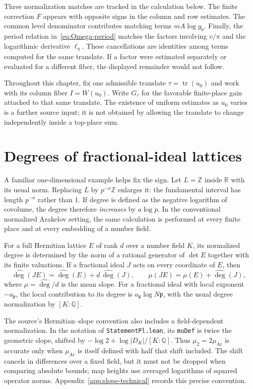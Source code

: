 \documentclass[11pt,openany,oneside]{scrbook}
\theoremstyle{definition}
\theoremstyle{remark}
\newcommand{\RR}{\mathbb R}
\newcommand{\QQ}{\mathbb Q}
\newcommand{\ZZ}{\mathbb Z}
\begin{document}
Three normalization matches are tracked in the calculation below. The finite correction $F$ appears with opposite signs in the column and row estimates. The common level denominator contributes matching terms $mA\log g_0$. Finally, the period relation in~\eqref{eq:Omega-period} matches the factors involving $v/\pi$ and the logarithmic derivative $\ell_\eta$. These cancellations are identities among terms computed for the same translate. If a factor were estimated separately or evaluated for a different fiber, the displayed remainder would not follow.

Throughout this chapter, fix one admissible translate $\tau=\operatorname{tr}(u_0)$ and work with its column fiber $I=W(u_0)$. Write $G_\tau$ for the favorable finite-place gain attached to that same translate. The existence of uniform estimates as $u_0$ varies is a further source input; it is not obtained by allowing the translate to change independently inside a top-place sum.

\section{Degrees of fractional-ideal lattices}\label{sec:balance-degree}

A familiar one-dimensional example helps fix the sign.  Let $L=\ZZ$ inside $\RR$ with its usual norm.  Replacing $L$ by $p^{-a}\ZZ$ enlarges it: the fundamental interval has length $p^{-a}$ rather than $1$.  If degree is defined as the negative logarithm of covolume, the degree therefore \emph{increases} by $a\log p$.  In the conventional normalized Arakelov setting, the same calculation is performed at every finite place and at every embedding of a number field.

For a full Hermitian lattice $E$ of rank $d$ over a number field $K$, its normalized degree is determined by the norm of a rational generator of $\det E$ together with its finite valuations.  If a fractional ideal $J$ acts on every coordinate of $E$, then
\begin{equation}\label{eq:ideal-degree-shift}
\widehat\deg(JE)=\widehat\deg(E)+d\,\widehat\deg(J),
\qquad
\mu(JE)=\mu(E)+\widehat\deg(J),
\end{equation}
where $\mu=\widehat\deg/d$ is the mean slope.  For a fractional ideal with local exponent $-a_\mathfrak p$, the local contribution to its degree is $a_\mathfrak p\log N\mathfrak p$, with the usual degree normalization by $[K:\QQ]$.

The source's Hermitian--slope convention also includes a field-dependent normalization. In the notation of \texttt{StatementPl.lean}, its \texttt{muDef} is twice the geometric slope, shifted by $-\log 2+\log|D_K|/[K:\QQ]$. Thus $\mu_2=2\mu_{\mathrm{Ar}}$ is accurate only when $\mu_{\mathrm{Ar}}$ is itself defined with half that shift included. The shift cancels in differences over a fixed field, but it must not be dropped when comparing absolute bounds; map heights use averaged logarithms of squared operator norms. Appendix~\ref{app:slope-technical} records this precise convention.
\end{document}
